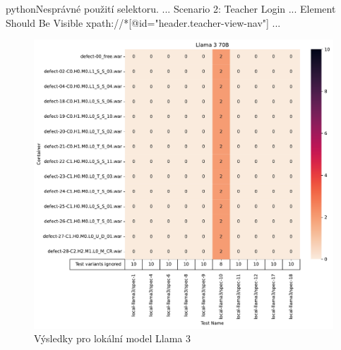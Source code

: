 \documentclass[czech, ma, kiv, he, iso690alph, pdf, viewonly]{fasthesis}
\begin{document}
            \begin{code}{python}{Nesprávné použití selektoru. \label{lst:wrong_selector}}
                ...
                Scenario 2: Teacher Login
                ...
                Element Should Be Visible    xpath://*[@id="header.teacher-view-nav"]
            ...            \end{code}

            \begin{figure}[H]
                \includegraphics[width=\textwidth]{pic/llama-3-results.pdf}
                \caption{Výsledky pro lokální model Llama 3}
                \label{fig:res:llama3}
            \end{figure}
\end{document}
